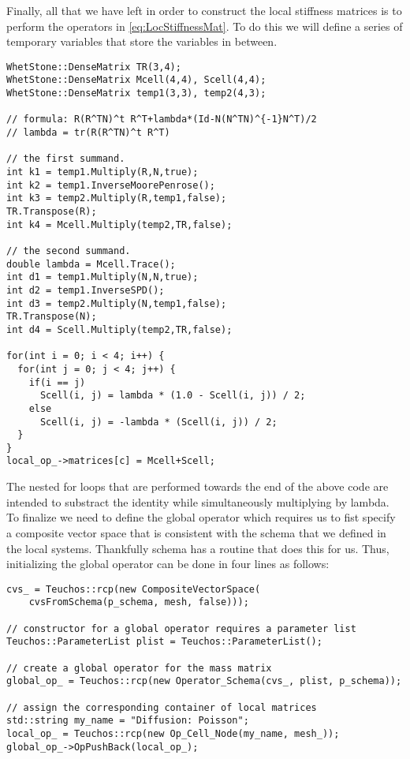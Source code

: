%
Finally, all that we have left in order to construct the local stiffness matrices is to perform the operators in \eqref{eq:LocStiffnessMat}.
%
To do this we will define a series of temporary variables that store the variables in between.
%
\begin{lstlisting}
WhetStone::DenseMatrix TR(3,4);
WhetStone::DenseMatrix Mcell(4,4), Scell(4,4);
WhetStone::DenseMatrix temp1(3,3), temp2(4,3);

// formula: R(R^TN)^t R^T+lambda*(Id-N(N^TN)^{-1}N^T)/2
// lambda = tr(R(R^TN)^t R^T)

// the first summand.
int k1 = temp1.Multiply(R,N,true);
int k2 = temp1.InverseMoorePenrose();
int k3 = temp2.Multiply(R,temp1,false);
TR.Transpose(R);
int k4 = Mcell.Multiply(temp2,TR,false);

// the second summand.
double lambda = Mcell.Trace();
int d1 = temp1.Multiply(N,N,true);
int d2 = temp1.InverseSPD();
int d3 = temp2.Multiply(N,temp1,false);
TR.Transpose(N);
int d4 = Scell.Multiply(temp2,TR,false);

for(int i = 0; i < 4; i++) {
  for(int j = 0; j < 4; j++) {
    if(i == j)
      Scell(i, j) = lambda * (1.0 - Scell(i, j)) / 2;
    else
      Scell(i, j) = -lambda * (Scell(i, j)) / 2;
  }
}
local_op_->matrices[c] = Mcell+Scell;
\end{lstlisting} 
%
The nested for loops that are performed towards the end of the above code are intended to substract the identity while simultaneously multiplying by lambda.
\\
To finalize we need to define the global operator which requires us to fist specify a composite vector space that is consistent with the schema that we defined in the local systems.
%
Thankfully schema has a routine that does this for us. 
%
Thus, initializing the global operator can be done in four lines as follows:
%
\begin{lstlisting}
cvs_ = Teuchos::rcp(new CompositeVectorSpace(
    cvsFromSchema(p_schema, mesh, false)));

// constructor for a global operator requires a parameter list
Teuchos::ParameterList plist = Teuchos::ParameterList();

// create a global operator for the mass matrix
global_op_ = Teuchos::rcp(new Operator_Schema(cvs_, plist, p_schema));

// assign the corresponding container of local matrices
std::string my_name = "Diffusion: Poisson";
local_op_ = Teuchos::rcp(new Op_Cell_Node(my_name, mesh_));
global_op_->OpPushBack(local_op_);
\end{lstlisting}



